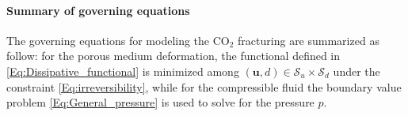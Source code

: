 

\paragraph{Summary of governing equations} The governing equations for modeling the CO$_2$ fracturing are summarized as follow: for the porous medium deformation, the functional defined in \eqref{Eq:Dissipative_functional} is minimized among $(\bm{u},d)\in \mathscr{S}_u\times\mathscr{S}_d$ under the constraint \eqref{Eq:irreversibility}, while %
for the compressible fluid the boundary value problem \eqref{Eq:General_pressure} is used to solve for the pressure $p$.

